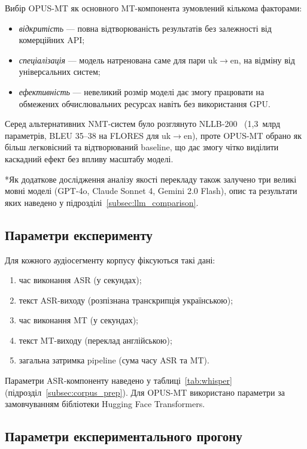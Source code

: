 Вибір OPUS-MT як основного MT-компонента зумовлений кількома факторами:
\begin{itemize}[nosep]
    \item \textit{відкритість} --- повна відтворюваність результатів без
    залежності від комерційних API;
    \item \textit{спеціалізація} --- модель натренована саме для пари
    uk$\to$en, на відміну від універсальних систем;
    \item \textit{ефективність} --- невеликий розмір моделі дає змогу
    працювати на обмежених обчислювальних ресурсах навіть без використання GPU.
\end{itemize}

Серед альтернативних NMT-систем було розглянуто NLLB-200~\cite{nllb}
(1,3~млрд параметрів, BLEU 35--38 на FLORES для uk$\to$en), проте OPUS-MT
обрано як більш легковісний та відтворюваний baseline, що дає змогу чітко
виділити каскадний ефект без впливу масштабу моделі.

*Як додаткове дослідження аналізу якості перекладу також залучено три великі мовні
моделі (GPT-4o, Claude Sonnet 4, Gemini 2.0 Flash), опис та результати
яких наведено у підрозділі~\ref{subsec:llm_comparison}.

\subsection{Параметри експерименту}

Для кожного аудіосегменту корпусу фіксуються такі дані:
\begin{enumerate}[nosep]
    \item час виконання ASR (у секундах);
    \item текст ASR-виходу (розпізнана транскрипція українською);
    \item час виконання MT (у секундах);
    \item текст MT-виходу (переклад англійською);
    \item загальна затримка pipeline (сума часу ASR та MT).
\end{enumerate}

Параметри ASR-компоненту наведено у таблиці~\ref{tab:whisper} (підрозділ~\ref{subsec:corpus_prep}).
Для OPUS-MT використано параметри за замовчуванням бібліотеки Hugging Face
Transformers.

\subsection{Параметри експериментального прогону}

